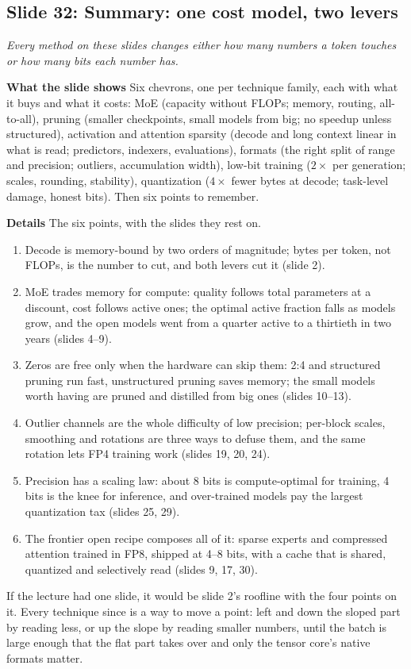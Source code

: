 \documentclass[11pt,letterpaper]{article}
\newcommand{\slide}[3]{%
  \subsection[Slide #1: #2]{Slide #1: #2}%
  {\color{muted}\itshape #3\par}\medskip}
\newcommand{\para}[1]{\medskip\noindent\textbf{#1}\quad}
\newenvironment{intuition}{\begin{tcolorbox}[intuitionbox]}{\end{tcolorbox}}
\begin{document}
\slide{32}{Summary: one cost model, two levers}{Every method on these slides changes either how many numbers a token touches or how many bits each number has.}

\para{What the slide shows} Six chevrons, one per technique family, each with what it buys and what it costs: MoE (capacity without FLOPs; memory, routing, all-to-all), pruning (smaller checkpoints, small models from big; no speedup unless structured), activation and attention sparsity (decode and long context linear in what is read; predictors, indexers, evaluations), formats (the right split of range and precision; outliers, accumulation width), low-bit training ($2\times$ per generation; scales, rounding, stability), quantization ($4\times$ fewer bytes at decode; task-level damage, honest bits). Then six points to remember.

\para{Details} The six points, with the slides they rest on.
\begin{enumerate}
  \item Decode is memory-bound by two orders of magnitude; bytes per token, not FLOPs, is the number to cut, and both levers cut it (slide 2).
  \item MoE trades memory for compute: quality follows total parameters at a discount, cost follows active ones; the optimal active fraction falls as models grow, and the open models went from a quarter active to a thirtieth in two years (slides 4--9).
  \item Zeros are free only when the hardware can skip them: 2:4 and structured pruning run fast, unstructured pruning saves memory; the small models worth having are pruned and distilled from big ones (slides 10--13).
  \item Outlier channels are the whole difficulty of low precision; per-block scales, smoothing and rotations are three ways to defuse them, and the same rotation lets FP4 training work (slides 19, 20, 24).
  \item Precision has a scaling law: about 8 bits is compute-optimal for training, 4 bits is the knee for inference, and over-trained models pay the largest quantization tax (slides 25, 29).
  \item The frontier open recipe composes all of it: sparse experts and compressed attention trained in FP8, shipped at 4--8 bits, with a cache that is shared, quantized and selectively read (slides 9, 17, 30).
\end{enumerate}

\begin{intuition}
If the lecture had one slide, it would be slide 2's roofline with the four points on it. Every technique since is a way to move a point: left and down the sloped part by reading less, or up the slope by reading smaller numbers, until the batch is large enough that the flat part takes over and only the tensor core's native formats matter.
\end{intuition}
\end{document}
